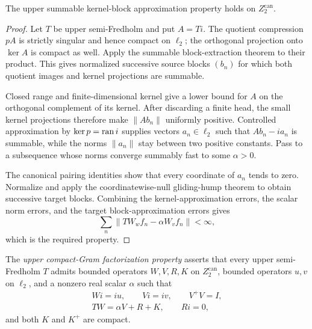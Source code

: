\begin{lemma}
\label{lem:upper-summable-kernel-block-selection}
The upper summable kernel-block approximation property holds on
$Z_2^{\mathrm{can}}$.
\leanok
\end{lemma}

\begin{proof}
Let $T$ be upper semi-Fredholm and put $A=Ti$.  The quotient compression $pA$ is strictly
singular and hence compact on $\ell_2$; the orthogonal projection onto $\ker A$ is compact as well.
Apply the summable block-extraction theorem to their product.  This gives normalized successive
source blocks $(b_n)$ for which both quotient images and kernel projections are summable.

Closed range and finite-dimensional kernel give a lower bound for $A$ on the orthogonal complement
of its kernel.  After discarding a finite head, the small kernel projections therefore make
$\lVert Ab_n\rVert$ uniformly positive.  Controlled approximation by $\ker p=\operatorname{ran} i$ supplies
vectors $a_n\in\ell_2$ such that $Ab_n-ia_n$ is summable, while the norms $\lVert a_n\rVert$ stay
between two positive constants.  Pass to a subsequence whose norms converge summably fast to some
$\alpha>0$.

The canonical pairing identities show that every coordinate of $a_n$ tends to zero.  Normalize and
apply the coordinatewise-null gliding-hump theorem to obtain successive target blocks.  Combining
the kernel-approximation errors, the scalar norm errors, and the target block-approximation errors
gives
\[
  \sum_n\lVert TW_wf_n-\alpha W_vf_n\rVert<\infty ,
\]
which is the required property.
\end{proof}

\begin{definition}
\label{def:upper-compact-gram-factorization}
The \emph{upper compact-Gram factorization property} asserts that every upper semi-Fredholm
$T$ admits bounded operators $W,V,R,K$ on $Z_2^{\mathrm{can}}$, bounded operators $u,v$ on
$\ell_2$, and a nonzero real scalar $\alpha$ such that
\[
\begin{gathered}
  Wi=iu,\qquad Vi=iv,\qquad V^+V=I,\\
  TW=\alpha V+R+K,\qquad Ri=0,
\end{gathered}
\]
and both $K$ and $K^+$ are compact.
\leanok
\end{definition}

